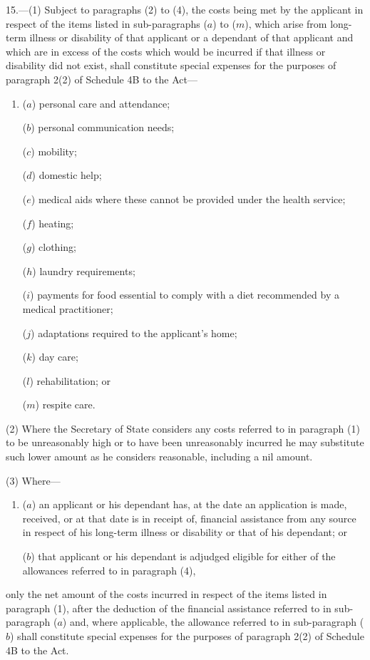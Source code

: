 \documentclass[a4paper]{article}
\begin{document}
15.—(1) Subject to paragraphs (2) to (4), the costs being
met by the applicant in respect of the items listed in sub-paragraphs ($a$) to
($m$), which arise from long-term illness or disability of that applicant or a
dependant of that applicant and which are in excess of the costs which would be
incurred if that illness or disability did not exist, shall constitute special
expenses for the purposes of paragraph 2(2) of Schedule 4B to the Act—
\begin{enumerate}\item[]
($a$) personal care and attendance;

($b$) personal communication needs;

($c$) mobility;

($d$) domestic help;

($e$) medical aids where these cannot be provided under the health service;

($f$) heating;

($g$) clothing;

($h$) laundry requirements;

($i$) payments for food essential to comply with a diet recommended by a medical
practitioner;

($j$) adaptations required to the applicant’s home;

($k$) day care;

($l$) rehabilitation; or

($m$) respite care.
\end{enumerate}

(2) Where the Secretary of State considers any costs referred to in paragraph
(1) to be unreasonably high or to have been unreasonably incurred he may
substitute such lower amount as he considers reasonable, including a nil amount.

(3) Where—
\begin{enumerate}\item[]
($a$) an applicant or his dependant has, at the date an application is made,
received, or at that date is in receipt of, financial assistance from any source
in respect of his long-term illness or disability or that of his dependant; or

($b$) that applicant or his dependant is adjudged eligible for either of the
allowances referred to in paragraph (4),
\end{enumerate}
only the net amount of the costs incurred in respect of the items listed in
paragraph (1), after the deduction of the financial assistance referred to in
sub-paragraph ($a$) and, where applicable, the allowance referred to in
sub-paragraph ($b$) shall constitute special expenses for the purposes of
paragraph 2(2) of Schedule 4B to the Act.
\end{document}
